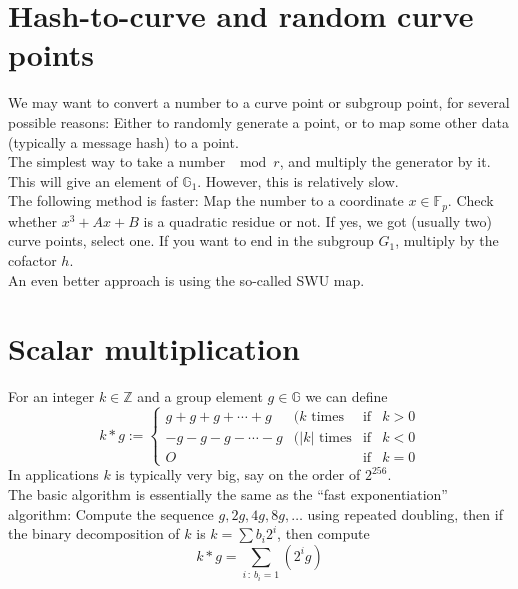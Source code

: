 \documentclass[12pt,draft,a4paper,openany,oneside]{amsbook}
\def\F{\mathbb{F}}
\def\G{\mathbb{G}}
\def\Z{\mathbb{Z}}
\theoremstyle{plain}
\theoremstyle{definition}
\begin{document}

\section{Hash-to-curve and random curve points}

We may want to convert a number to a curve point or subgroup point, for several 
possible reasons: Either to randomly generate a point, or to map some other
data (typically a message hash) to a point.\\

The simplest way to take a number $\mod r$, and multiply the generator by it.
This will give an element of $\G_1$. However, this is relatively slow.\\

The following method is faster: Map the number to a coordinate $x\in\F_p$. Check
whether $x^3+Ax+B$ is a quadratic residue or not. If yes, we got (usually two)
curve points, select one. If you want to end in the subgroup $G_1$, multiply by
the cofactor $h$.\\

An even better approach is using the so-called SWU map.


\section{Scalar multiplication}

For an integer $k\in \Z$ and a group element $g\in\G$ we can define
\[ k*g := \left\{\begin{array}{llll}
g+g+g+\cdots +g  &(k   \textrm{ times}&\textrm{if}& k > 0 \\
-g-g-g-\cdots -g &(|k| \textrm{ times}&\textrm{if}& k < 0 \\
O                &                    &\textrm{if}& k = 0
\end{array}
\right.
\]
In applications $k$ is typically very big, say on the order of $2^{256}$.\\

The basic algorithm is essentially the same as the ``fast exponentiation''
algorithm: Compute the sequence $g,2g,4g,8g,\dots$ using repeated doubling,
then if the binary decomposition of $k$ is $k=\sum b_i2^i$, then compute
\[ k*g = \sum_{i\,:\,b_i=1} (2^i g) \]
\end{document}
